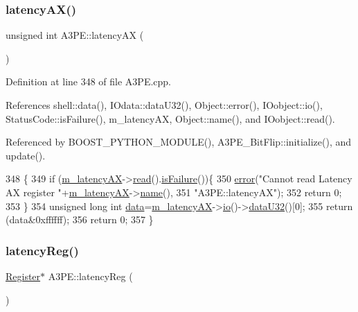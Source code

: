 \subsubsection{\texorpdfstring{latency\+A\+X()}{latencyAX()}}
{\footnotesize\ttfamily unsigned int A3\+P\+E\+::latency\+AX (\begin{DoxyParamCaption}{ }\end{DoxyParamCaption})}



Definition at line 348 of file A3\+P\+E.\+cpp.



References shell\+::data(), I\+Odata\+::data\+U32(), Object\+::error(), I\+Oobject\+::io(), Status\+Code\+::is\+Failure(), m\+\_\+latency\+AX, Object\+::name(), and I\+Oobject\+::read().



Referenced by B\+O\+O\+S\+T\+\_\+\+P\+Y\+T\+H\+O\+N\+\_\+\+M\+O\+D\+U\+L\+E(), A3\+P\+E\+\_\+\+Bit\+Flip\+::initialize(), and update().


\begin{DoxyCode}
348                             \{
349   \textcolor{keywordflow}{if} (\hyperlink{classA3PE_a061472eb539bb6ac99f4fa11a760eeaf}{m\_latencyAX}->\hyperlink{classIOobject_aa07610c11963b1db6710e3c76ceea456}{read}().\hyperlink{classStatusCode_a5dd22dc6eb2c52fc4cabc58f6dea2eb7}{isFailure}())\{
350     \hyperlink{classObject_a204a95f57818c0f811933917a30eff45}{error}(\textcolor{stringliteral}{"Cannot read Latency AX register "}+\hyperlink{classA3PE_a061472eb539bb6ac99f4fa11a760eeaf}{m\_latencyAX}->\hyperlink{classObject_a300f4c05dd468c7bb8b3c968868443c1}{name}(),
351         \textcolor{stringliteral}{"A3PE::latencyAX"});
352     \textcolor{keywordflow}{return} 0;
353   \}
354   \textcolor{keywordtype}{unsigned} \textcolor{keywordtype}{long} \textcolor{keywordtype}{int} \hyperlink{namespaceshell_a5ea2525995cedc3efd69ea8a7f034d1e}{data}=\hyperlink{classA3PE_a061472eb539bb6ac99f4fa11a760eeaf}{m\_latencyAX}->\hyperlink{classIOobject_af04fb94137c3d86849f478ac5afab5d1}{io}()->\hyperlink{classIOdata_ab0e3cd09f46c1c3712f797116f6da074}{dataU32}()[0];
355   \textcolor{keywordflow}{return} (data&0xffffff);
356   \textcolor{keywordflow}{return} 0;
357 \}
\end{DoxyCode}
\mbox{\label{classA3PE_a42dad20d5a1482431e73c64250b76185}} 
\subsubsection{\texorpdfstring{latency\+Reg()}{latencyReg()}}
{\footnotesize\ttfamily \hyperlink{classRegister}{Register}$\ast$ A3\+P\+E\+::latency\+Reg (\begin{DoxyParamCaption}{ }\end{DoxyParamCaption})\hspace{0.3cm}{\ttfamily [inline]}}



